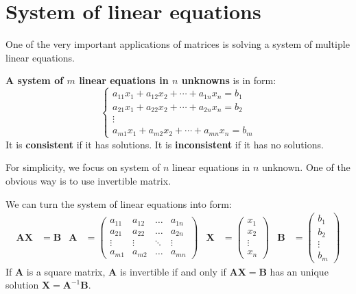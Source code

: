 \documentclass{huhtakm-template-book}
\begin{document}
\chapter{System of linear equations}
One of the very important applications of matrices is solving a system of multiple linear equations.
\begin{defn}
    \textbf{A system of $m$ linear equations in $n$ unknowns} is in form:
    \begin{equation*}
        \begin{cases}
            a_{11}x_{1}+a_{12}x_{2}+\cdots+a_{1n}x_{n}=b_{1}\\
            a_{21}x_{1}+a_{22}x_{2}+\cdots+a_{2n}x_{n}=b_{2}\\
            \vdots\\
            a_{m1}x_{1}+a_{m2}x_{2}+\cdots+a_{mn}x_{n}=b_{m}
        \end{cases}
    \end{equation*}
    It is \textbf{consistent} if it has solutions. It is \textbf{inconsistent} if it has no solutions.
\end{defn}
For simplicity, we focus on system of 
$n$ linear equations in $n$ unknown. One of the obvious way is to use invertible matrix.
\begin{thm}
    We can turn the system of linear equations into form:
    \begin{align*}
        \mathbf{AX}&=\mathbf{B} & \mathbf{A}&=\begin{pmatrix}
            a_{11} & a_{12} & \hdots & a_{1n}\\
            a_{21} & a_{22} & \hdots & a_{2n}\\
            \vdots & \vdots & \ddots & \vdots\\
            a_{m1} & a_{m2} & \hdots & a_{mn}
        \end{pmatrix} & \mathbf{X}&=\begin{pmatrix}
            x_{1}\\
            x_{2}\\
            \vdots\\
            x_{n}
        \end{pmatrix} & \mathbf{B}&=\begin{pmatrix}
            b_{1}\\
            b_{2}\\
            \vdots\\
            b_{m}
        \end{pmatrix}
    \end{align*}
    If $\mathbf{A}$ is a square matrix, $\mathbf{A}$ is invertible if and only if $\mathbf{AX}=\mathbf{B}$ has an unique solution $\mathbf{X}=\mathbf{A}^{-1}\mathbf{B}$.
\end{thm}
\end{document}
